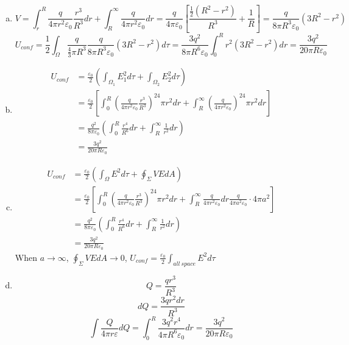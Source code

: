 \documentclass{article}
\begin{document}
\section{}
\begin{enumerate}[(a)]
\item
$$V=\int_r^R\frac{q}{4\pi r^2\varepsilon_0}\frac{r^3}{R^3}dr+\int_R^{\infty}\frac{q}{4\pi r^2\varepsilon_0}dr
=\frac{q}{4\pi\varepsilon_0}\left[\frac{\frac{1}{2}(R^2-r^2)}{R^3}+\frac{1}{R}\right]
=\frac{q}{8\pi R^3\varepsilon_0}(3R^2-r^2)$$
$$U_{conf}=\frac{1}{2}\int_{\Omega}\frac{q}{\frac{4}{3}\pi R^3}\frac{q}{8\pi R^3\varepsilon_0}(3R^2-r^2)d\tau=\frac{3q^2}{8\pi R^6\varepsilon_0}\int_0^Rr^2(3R^2-r^2)dr=\frac{3q^2}{20\pi R\varepsilon_0}$$
\item
\begin{align*}
U_{conf}&=\frac{\varepsilon_0}{2}\left(\int_{\Omega_1}E_1^2d\tau+\int_{\Omega_2}E_2^2d\tau\right)\\
&=\frac{\varepsilon_0}{2}\left[\int_0^R\left(\frac{q}{4\pi r^2\varepsilon_0}\frac{r^3}{R^3}\right)^24\pi r^2dr+\int_R^{\infty}\left(\frac{q}{4\pi r^2\varepsilon_0}\right)^24\pi r^2dr\right]\\
&=\frac{q^2}{8\pi\varepsilon_0}\left(\int_0^R\frac{r^4}{R^6}dr+\int_R^{\infty}\frac{1}{r^2}dr\right)\\
&=\frac{3q^2}{20\pi R\varepsilon_0}
\end{align*}
\item
\begin{align*}
U_{conf}&=\frac{\varepsilon_0}{2}\left(\int_{\Omega}E^2d\tau+\oint_{\Sigma}VEdA\right)\\
&=\frac{\varepsilon_0}{2}\left[\int_0^R\left(\frac{q}{4\pi r^2\varepsilon_0}\frac{r^3}{R^3}\right)^24\pi r^2dr+\int_R^{\infty}\frac{q}{4\pi r^2\varepsilon_0}dr\frac{q}{4\pi a^2\varepsilon_0}\cdot4\pi a^2\right]\\
&=\frac{q^2}{8\pi\varepsilon_0}\left(\int_0^R\frac{r^4}{R^6}dr+\int_R^{\infty}\frac{1}{r^2}dr\right)\\
&=\frac{3q^2}{20\pi R\varepsilon_0}
\end{align*}
When $a\to\infty$, $\oint_{\Sigma}VEdA\to0$, $U_{conf}=\frac{\varepsilon_0}{2}\int_{all\ space}E^2d\tau$
\item
$$Q=\frac{qr^3}{R^3}$$
$$dQ=\frac{3qr^2dr}{R^3}$$
$$\int\frac{Q}{4\pi r\varepsilon}dQ=\int_0^R\frac{3q^2r^4}{4\pi R^6\varepsilon_0}dr=\frac{3q^2}{20\pi R\varepsilon_0}$$

\end{enumerate}
\end{document}
